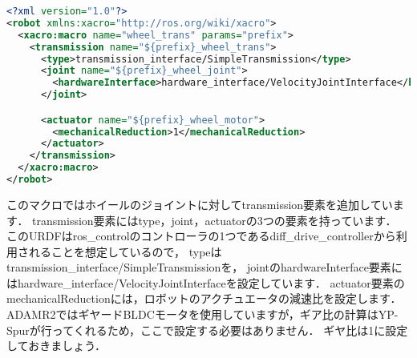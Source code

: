 \documentclass[{../../master}]{subfiles}
\begin{document}
\begin{lstlisting}[language=XML, label=code:transmission_xacro, caption=\textsf{transmission.xacro}]
<?xml version="1.0"?>
<robot xmlns:xacro="http://ros.org/wiki/xacro">
  <xacro:macro name="wheel_trans" params="prefix">
    <transmission name="${prefix}_wheel_trans">
      <type>transmission_interface/SimpleTransmission</type>
      <joint name="${prefix}_wheel_joint">
        <hardwareInterface>hardware_interface/VelocityJointInterface</hardwareInterface>
      </joint>

      <actuator name="${prefix}_wheel_motor">
        <mechanicalReduction>1</mechanicalReduction>
      </actuator>
    </transmission>
  </xacro:macro>
</robot>
\end{lstlisting}

このマクロではホイールのジョイントに対して\textsf{transmission}要素を追加しています．
\textsf{transmission}要素には\textsf{type}，\textsf{joint}，\textsf{actuator}の3つの要素を持っています．
このURDFは\textsf{ros\_control}のコントローラの1つである\textsf{diff\_drive\_controller}から利用されることを想定しているので，
\textsf{type}は\textsf{transmission\_interface/SimpleTransmission}を，
\textsf{joint}の\textsf{hardwareInterface}要素には\textsf{hardware\_interface/VelocityJointInterface}を設定しています．
\textsf{actuator}要素の\textsf{mechanicalReduction}には，ロボットのアクチュエータの減速比を設定します．
ADAMR2ではギヤードBLDCモータを使用していますが，ギア比の計算はYP-Spurが行ってくれるため，ここで設定する必要はありません．
ギヤ比は1に設定しておきましょう．
\end{document}
